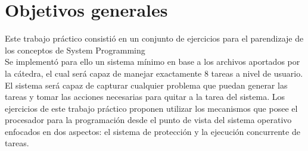 \documentclass[a4paper]{article}
\begin{document}
\thispagestyle{empty}

\maketitle
\newpage

\thispagestyle{empty}
\vfill
\begin{abstract}
En el presente trabajo se realiza la configuraci\'on de un kernel de sistema operativo de 32bits con sus elementos indispensables (GDT, IDT, TSS, paginaci\'on, etc) y el manejo de tareas.
\end{abstract}
\newpage
\thispagestyle{empty}
\vspace{3cm}
\tableofcontents
\newpage


\normalsize
\newpage

\section{Objetivos generales}

Este trabajo pr\'actico consisti\'o en un conjunto de ejercicios para el parendizaje de los conceptos de System Programming
\\
Se implement\'o para ello un sistema m\'inimo en base a los archivos aportados por la c\'atedra, el cual ser\'a capaz de manejar exactamente 8 tareas a nivel de usuario.
El sistema ser\'a capaz de capturar cualquier problema que puedan generar las tareas y tomar las acciones necesarias para quitar a la tarea del sistema.
Los ejercicios de este trabajo pr\'actico proponen utilizar los mecanismos que posee el procesador para la programaci\'on desde el punto de vista del sistema operativo 
enfocados en dos aspectos: el sistema de protecci\'on y la ejecuci\'on concurrente de tareas.

%
\newpage

\newpage

\newpage

\newpage

\newpage

\newpage

\newpage

\newpage

\newpage
\end{document}
